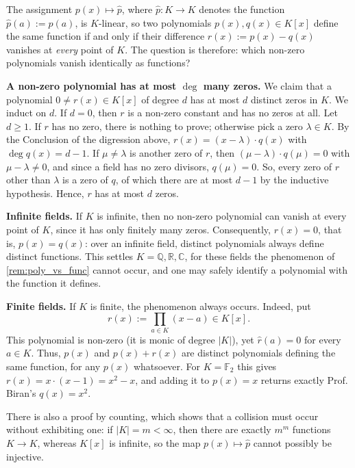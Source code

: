 \begin{exercisesolution*}
\label{sol:poly_vs_func}
  The assignment $p(x) \mapsto \hat{p}$, where $\hat{p} : K \to K$ denotes the function $\hat{p}(a) := p(a)$, is $K$-linear, so two polynomials $p(x), q(x) \in K[x]$ define the same function if and only if their difference $r(x) := p(x) - q(x)$ vanishes at \emph{every} point of $K$. The question is therefore: which non-zero polynomials vanish identically as functions?

  \textbf{A non-zero polynomial has at most $\deg$ many zeros.} We claim that a polynomial $0 \ne r(x) \in K[x]$ of degree $d$ has at most $d$ distinct zeros in $K$. We induct on $d$. If $d = 0$, then $r$ is a non-zero constant and has no zeros at all. Let $d \ge 1$. If $r$ has no zero, there is nothing to prove; otherwise pick a zero $\lambda \in K$. By the Conclusion of the digression above, $r(x) = (x - \lambda) \cdot q(x)$ with $\deg q(x) = d-1$. If $\mu \ne \lambda$ is another zero of $r$, then $(\mu - \lambda) \cdot q(\mu) = 0$ with $\mu - \lambda \ne 0$, and since a field has no zero divisors, $q(\mu) = 0$. So, every zero of $r$ other than $\lambda$ is a zero of $q$, of which there are at most $d-1$ by the inductive hypothesis. Hence, $r$ has at most $d$ zeros.

  \textbf{Infinite fields.} If $K$ is infinite, then no non-zero polynomial can vanish at every point of $K$, since it has only finitely many zeros. Consequently, $r(x) = 0$, that is, $p(x) = q(x)$: over an infinite field, distinct polynomials always define distinct functions. This settles $K = \mathbb{Q}, \mathbb{R}, \mathbb{C}$, for these fields the phenomenon of \cref{rem:poly_vs_func} cannot occur, and one may safely identify a polynomial with the function it defines.

  \textbf{Finite fields.} If $K$ is finite, the phenomenon always occurs. Indeed, put
  \[ r(x) := \prod_{a \in K} (x - a) \in K[x]. \]
  This polynomial is non-zero (it is monic of degree $|K|$), yet $\hat{r}(a) = 0$ for every $a \in K$. Thus, $p(x)$ and $p(x) + r(x)$ are distinct polynomials defining the same function, for any $p(x)$ whatsoever. For $K = \mathbb{F}_2$ this gives $r(x) = x \cdot (x-1) = x^2 - x$, and adding it to $p(x) = x$ returns exactly Prof. Biran's $q(x) = x^2$.

  There is also a proof by counting, which shows that a collision must occur without exhibiting one: if $|K| = m < \infty$, then there are exactly $m^m$ functions $K \to K$, whereas $K[x]$ is infinite, so the map $p(x) \mapsto \hat{p}$ cannot possibly be injective.
\end{exercisesolution*}

